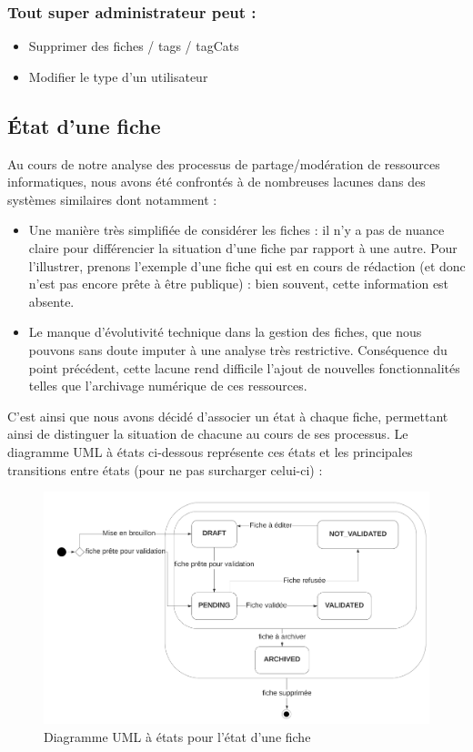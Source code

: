 \subsubsection*{Tout super administrateur peut : }
\begin{itemize}
    \item Supprimer des \glspl{fiche} / \glspl{tag} / \glspl{tagCat}
    \item Modifier le type d'un utilisateur
\end{itemize}
\pagebreak
\subsection*{État d'une \gls{fiche}}

Au cours de notre analyse des processus de partage/modération de ressources informatiques, nous avons été confrontés à de nombreuses lacunes dans des systèmes similaires dont notamment :
\begin{itemize}
    \item Une manière très simplifiée de considérer les \glspl{fiche} : il n'y a pas de nuance claire pour différencier la situation d'une \gls{fiche} par rapport à une autre. Pour l'illustrer, prenons l'exemple d'une \gls{fiche} qui est en cours de rédaction (et donc n'est pas encore prête à être publique) : bien souvent, cette information est absente.
    \item Le manque d'évolutivité technique dans la gestion des \glspl{fiche}, que nous pouvons sans doute imputer à une analyse très restrictive. Conséquence du point précédent, cette lacune rend difficile l'ajout de nouvelles fonctionnalités telles que l'archivage numérique de ces ressources. 
\end{itemize}

C'est ainsi que nous avons décidé d'associer un état à chaque \gls{fiche}, permettant ainsi de distinguer la situation de chacune au cours de ses processus. Le diagramme UML à états ci-dessous représente ces états et les principales transitions entre états (pour ne pas surcharger celui-ci) :

\begin{figure}[H]
    \includegraphics[width=\textwidth,height=\textheight,keepaspectratio]{images/StateFiches.png}
    \centering
    \caption{Diagramme UML à états pour l'état d'une \gls{fiche}}
    \label{pic:stateDiagramForFiches}
\end{figure}

